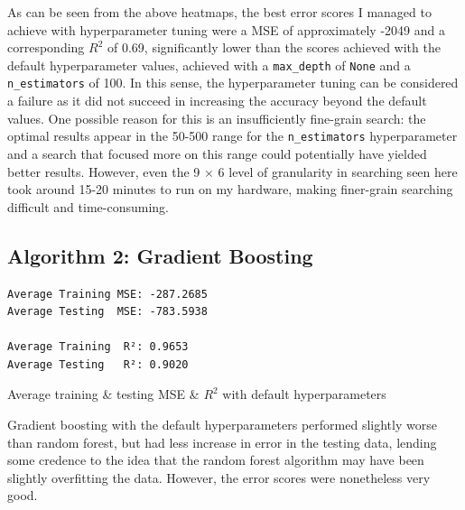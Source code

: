 \documentclass[a4paper]{article}
\newenvironment{code}{\captionsetup{type=listing}}{}
\begin{document}
As can be seen from the above heatmaps, the best error scores I managed to achieve with hyperparameter tuning were a MSE of approximately -2049 and a corresponding $R^2$ of 0.69, significantly lower than the scores achieved with the default hyperparameter values, achieved with a \texttt{max_depth} of \texttt{None} and a \texttt{n_estimators} of 100.
In this sense, the hyperparameter tuning can be considered a failure as it did not succeed in increasing the accuracy beyond the default values.
One possible reason for this is an insufficiently fine-grain search: the optimal results appear in the 50-500 range for the \texttt{n_estimators} hyperparameter and a search that focused more on this range could potentially have yielded better results.
However, even the 9 $\times$ 6 level of granularity in searching seen here took around 15-20 minutes to run on my hardware, making finer-grain searching difficult and time-consuming.

\subsection{Algorithm 2: Gradient Boosting}

\begin{code}
\begin{verbatim}
Average Training MSE: -287.2685
Average Testing  MSE: -783.5938

Average Training  R²: 0.9653
Average Testing   R²: 0.9020
\end{verbatim}
\caption{Average training \& testing MSE \& $R^2$ with default hyperparameters}
\end{code}

Gradient boosting with the default hyperparameters performed slightly worse than random forest, but had less increase in error in the testing data, lending some credence to the idea that the random forest algorithm may have been slightly overfitting the data.
However, the error scores were nonetheless very good.
\end{document}
